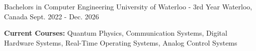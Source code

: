 

\begin{cventries}

	\cventry
	{Bachelors in Computer Engineering} %
	{University of Waterloo - 3rd Year} %
	{Waterloo, Canada} %
	{Sept. 2022 - Dec. 2026} %
	{
		\begin{cvitems} %
			\item {\textbf{Current Courses:} Quantum Physics, Communication Systems, Digital Hardware Systems, Real-Time Operating Systems, Analog Control Systems}
		\end{cvitems}
	}

\end{cventries}
